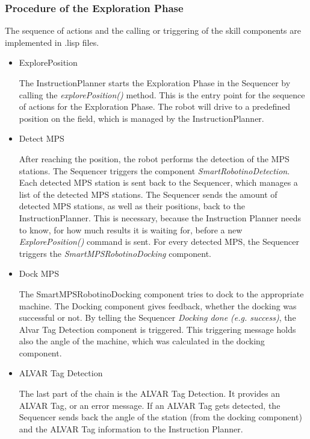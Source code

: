 \subsubsection{Procedure of the Exploration Phase}

The sequence of actions and the calling or triggering of the skill components are implemented in .lisp files.

\begin{itemize}

\item ExplorePosition

The InstructionPlanner starts the Exploration Phase in the Sequencer by calling the \textit{explorePosition()} method. This is the entry point for the sequence of actions for the Exploration Phase. The robot will drive to a predefined position on the field, which is managed by the InstructionPlanner.

\item Detect MPS

After reaching the position, the robot performs the detection of the MPS stations. The Sequencer triggers the component \textit{SmartRobotinoDetection}.
Each detected MPS station is sent back to the Sequencer, which manages a list of the detected MPS stations.
The Sequencer sends the amount of detected MPS stations, as well as their positions, back to the InstructionPlanner.
This is necessary, because the Instruction Planner needs to know, for how much results it is waiting for, before a new  \textit{ExplorePosition()} command is sent.
For every detected MPS, the Sequencer triggers the \textit{SmartMPSRobotinoDocking} component.

\item Dock MPS

The SmartMPSRobotinoDocking component tries to dock to the appropriate machine.
The Docking component gives feedback, whether the docking was successful or not. By telling the Sequencer \textit{Docking done (e.g. success)}, the Alvar Tag Detection component is triggered. This triggering message holds also the angle of the machine, which was calculated in the docking component.

\item ALVAR Tag Detection

The last part of the chain is the ALVAR Tag Detection. It provides an ALVAR Tag, or an error message.
If an ALVAR Tag gets detected, the Sequencer sends back the angle of the station (from the docking component) and the ALVAR Tag information to the Instruction Planner.

\end{itemize}

